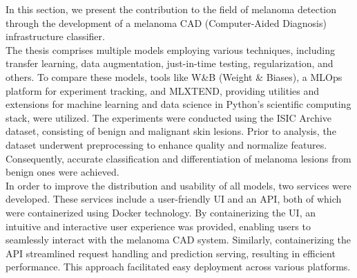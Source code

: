 In this section, we present the contribution to the field of melanoma detection through the development of a melanoma CAD (Computer-Aided Diagnosis) infrastructure classifier. \\

The thesis comprises multiple models employing various techniques, including transfer learning, data augmentation, just-in-time testing, regularization, and others. To compare these models, tools like W\&B (Weight \& Biases), a MLOps platform for experiment tracking, and MLXTEND, providing utilities and extensions for machine learning and data science in Python's scientific computing stack, were utilized. The experiments were conducted using the ISIC Archive dataset, consisting of benign and malignant skin lesions. Prior to analysis, the dataset underwent preprocessing to enhance quality and normalize features. Consequently, accurate classification and differentiation of melanoma lesions from benign ones were achieved. \\

In order to improve the distribution and usability of all models, two services were developed. These services include a user-friendly UI and an API, both of which were containerized using Docker technology. By containerizing the UI, an intuitive and interactive user experience was provided, enabling users to seamlessly interact with the melanoma CAD system. Similarly, containerizing the API streamlined request handling and prediction serving, resulting in efficient performance. This approach facilitated easy deployment across various platforms.